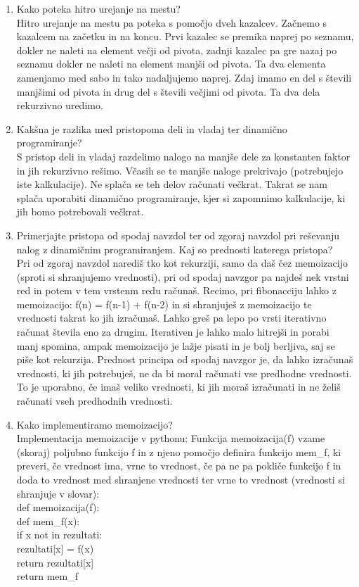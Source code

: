 \documentclass[a4paper]{article}
\begin{document}
\begin{enumerate}
        \item Kako poteka hitro urejanje na mestu?\\
        Hitro urejanje na mestu pa poteka s pomočjo dveh kazalcev. Začnemo s kazalcem na začetku in na koncu. Prvi kazalec se premika naprej po seznamu, dokler ne naleti na element večji od pivota, zadnji kazalec pa gre nazaj po seznamu dokler ne naleti na element manjši od pivota. Ta dva elementa zamenjamo med sabo in tako nadaljujemo naprej. Zdaj imamo en del s števili manjšimi od pivota in drug del s števili večjimi od pivota. Ta dva dela rekurzivno uredimo.
        
        \item Kakšna je razlika med pristopoma deli in vladaj ter dinamično programiranje?\\
        S pristop deli in vladaj razdelimo nalogo na manjše dele za konstanten faktor in jih rekurzivno rešimo. Včasih se te manjše naloge prekrivajo (potrebujejo iste kalkulacije). Ne splača se teh delov računati večkrat. Takrat se nam splača uporabiti dinamično programiranje, kjer si zapomnimo kalkulacije, ki jih bomo potrebovali večkrat.

        \item Primerjajte pristopa od spodaj navzdol ter od zgoraj navzdol pri reševanju nalog z dinamičnim programiranjem. Kaj so prednosti katerega pristopa?\\
        Pri od zgoraj navzdol narediš tko kot rekurziji, samo da daš čez memoizacijo (sproti si shranjujemo vrednosti), pri od spodaj navzgor pa najdeš nek vrstni red in potem v tem vrstenm redu računaš.
        Recimo, pri fibonacciju lahko z memoizacijo: f(n) = f(n-1) + f(n-2) in si shranjuješ z memoizacijo te vrednosti takrat ko jih izračunaš. Lahko greš pa lepo po vrsti iterativno računat števila eno za drugim.
        Iterativen je lahko malo hitrejši in porabi manj spomina, ampak memoizacijo je lažje pisati in je bolj berljiva, saj se piše kot rekurzija. Prednost principa od spodaj navzgor je, da lahko izračunaš vrednosti, ki jih potrebuješ, ne da bi moral računati vse predhodne vrednosti. To je uporabno, če imaš veliko vrednosti, ki jih moraš izračunati in ne želiš računati vseh predhodnih vrednosti.

        \item Kako implementiramo memoizacijo?\\
        Implementacija memoizacije v pythonu: Funkcija memoizacija(f) vzame (skoraj) poljubno funkcijo f in z njeno pomočjo definira funkcijo mem\_f, ki preveri, če vrednost ima, vrne to vrednost, če pa ne pa pokliče funkcijo f in doda to vrednost med shranjene vrednosti ter vrne to vrednost (vrednosti si shranjuje v slovar):\\
        def memoizacija(f):\\
        def mem\_f(x):\\
        if x not in rezultati:\\
            rezultati[x] = f(x)\\
        return rezultati[x]\\
        return mem\_f


\end{enumerate}
\end{document}
